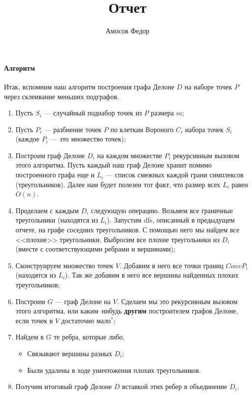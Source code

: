 \documentclass{article}
\title{\bf Отчет \No 5}
\author{Амосов Федор}
\begin{document}
	\maketitle

    \paragraph{Алгоритм\\}
	Итак, вспомним наш алгоритм построения графа Делоне $D$ на наборе точек $P$ через склеивание меньших подграфов.
    \begin{enumerate}
        \item Пусть $S_i$ --- случайный поднабор точек из $P$ размера $m$;
        \item Пусть $P_i$ --- разбиение точек $P$ по клеткам Вороного $C_i$ набора точек $S_i$ (каждое $P_i$ --- это множество точек);
        \item Построим граф Делоне $D_i$ на каждом множестве $P_i$ рекурсивным вызовом этого алгоритма. Пусть каждый наш граф Делоне хранит помимо построенного графа еще и $L_i$ --- список смежных каждой грани симплексов (треугольников). Далее нам будет полезен тот факт, что размер всех $L_i$ равен $O(n)$.  
        \item Проделаем с каждым $D_i$ следующую операцию. Возьмем все граничные треугольники (находятся из $L_i$). Запустим dfs, описанный в предыдущем отчете, на графе соседних треугольников. С помощью него мы найдем все <<плохие>> треугольники. Выбросим все плохие треугольники из $D_i$ (вместе с соответствующими ребрами и вершинами);
        \item Сконструируем множество точек $V$. Добавим в него все точки границ $Conv P_i$ (находятся из $L_i$). Так же добавим в него все вершины найденных плохих треугольников;
        \item Построим $G$ --- граф Делоне на $V$. Сделаем мы это рекурсивным вызовом этого алгоритма, или каким--нибудь {\bf другим} построителем графов Делоне, если точек в $V$ достаточно мало$^*$;
        \item Найдем в $G$ те ребра, которые либо,
            \begin{itemize}
                \item Связывают вершины разных $D_i$;
                \item Были удалены в ходе уничтожения плохих треугольников.
            \end{itemize}
        \item Получим итоговый граф Делоне $D$ вставкой этих ребер в объединение $D_i$.
    \end{enumerate}    
    
\end{document}
